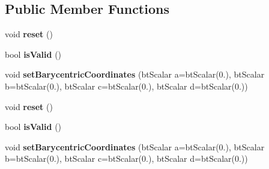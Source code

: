 \subsection*{Public Member Functions}
\begin{DoxyCompactItemize}
\item 
\mbox{\label{structbtSubSimplexClosestResult_a3c7307b4ee6bbfa030b104cccb2e5e2c}} 
void {\bfseries reset} ()
\item 
\mbox{\label{structbtSubSimplexClosestResult_a2b878f6f62b458c276368074e63ddad8}} 
bool {\bfseries is\+Valid} ()
\item 
\mbox{\label{structbtSubSimplexClosestResult_a4cd8e4b562ba07ad684e9df51e2f1910}} 
void {\bfseries set\+Barycentric\+Coordinates} (bt\+Scalar a=bt\+Scalar(0.), bt\+Scalar b=bt\+Scalar(0.), bt\+Scalar c=bt\+Scalar(0.), bt\+Scalar d=bt\+Scalar(0.))
\item 
\mbox{\label{structbtSubSimplexClosestResult_a3c7307b4ee6bbfa030b104cccb2e5e2c}} 
void {\bfseries reset} ()
\item 
\mbox{\label{structbtSubSimplexClosestResult_a2b878f6f62b458c276368074e63ddad8}} 
bool {\bfseries is\+Valid} ()
\item 
\mbox{\label{structbtSubSimplexClosestResult_a4cd8e4b562ba07ad684e9df51e2f1910}} 
void {\bfseries set\+Barycentric\+Coordinates} (bt\+Scalar a=bt\+Scalar(0.), bt\+Scalar b=bt\+Scalar(0.), bt\+Scalar c=bt\+Scalar(0.), bt\+Scalar d=bt\+Scalar(0.))
\end{DoxyCompactItemize}
